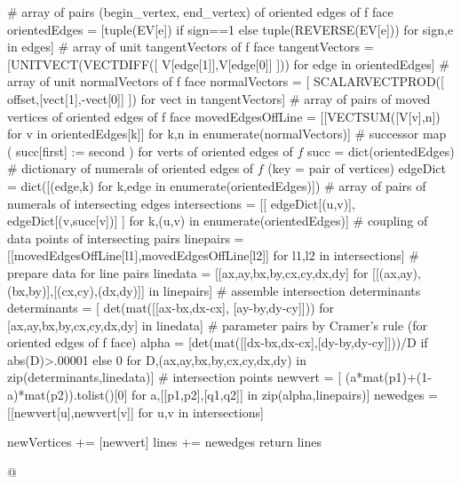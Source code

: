 \documentclass[11pt,oneside]{article}    %
\begin{document}
{        # array of pairs (begin_vertex, end_vertex) of oriented edges of f face
        orientedEdges = [tuple(EV[e]) if sign==1 else tuple(REVERSE(EV[e])) 
            for sign,e in edges]
        # array of unit tangentVectors of  f face
        tangentVectors = [UNITVECT(VECTDIFF([ V[edge[1]],V[edge[0]] ])) 
            for edge in orientedEdges]
        # array of unit normalVectors of   f face
        normalVectors = [ SCALARVECTPROD([ offset,[vect[1],-vect[0]] ]) 
            for vect in tangentVectors]
        # array of pairs of moved vertices  of oriented edges of f face
        movedEdgesOffLine = [[VECTSUM([V[v],n]) for v in orientedEdges[k]] 
            for k,n in enumerate(normalVectors)]
        # successor map ( succ[first] := second ) for verts of oriented edges of $f$ 
        succ = dict(orientedEdges)
        # dictionary of numerals of oriented edges of $f$ (key = pair of vertices)
        edgeDict = dict([(edge,k) for k,edge in enumerate(orientedEdges)])
        # array of pairs of numerals of intersecting edges
        intersections = [[ edgeDict[(u,v)], edgeDict[(v,succ[v])] ] 
            for k,(u,v) in enumerate(orientedEdges)]
        # coupling of data points of intersecting pairs
        linepairs = [[movedEdgesOffLine[l1],movedEdgesOffLine[l2]] 
            for l1,l2 in intersections]
        # prepare data for line pairs
        linedata = [[ax,ay,bx,by,cx,cy,dx,dy] 
            for [[(ax,ay),(bx,by)],[(cx,cy),(dx,dy)]] in linepairs]
        # assemble intersection determinants
        determinants = [ det(mat([[ax-bx,dx-cx], [ay-by,dy-cy]])) 
            for [ax,ay,bx,by,cx,cy,dx,dy] in linedata]
        # parameter pairs by Cramer's rule (for oriented edges of f face)
        alpha = [det(mat([[dx-bx,dx-cx],[dy-by,dy-cy]]))/D  if abs(D)>.00001 else 0 
            for D,(ax,ay,bx,by,cx,cy,dx,dy) in zip(determinants,linedata)]
        # intersection points
        newvert = [ (a*mat(p1)+(1-a)*mat(p2)).tolist()[0] 
            for a,[[p1,p2],[q1,q2]] in zip(alpha,linepairs)]
        newedges = [[newvert[u],newvert[v]] for u,v in intersections]

        newVertices += [newvert]
        lines += newedges  
    return lines

@}
\end{document}
